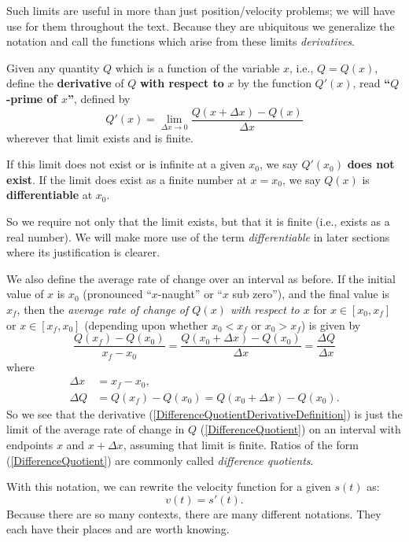 Such limits are useful in more than just position/velocity problems;
we will have use for them throughout the text.
Because they are ubiquitous we generalize the notation
and call the functions which arise from these limits
{\it derivatives}.  
%
\begin{definition}Given any quantity $Q$ which is a 
function of the variable $x$, i.e., $Q=Q(x)$,
define the {\bf derivative} of $Q$ {\bf with respect
to} $x$ by the function $Q'(x)$, read
{\bf ``$Q$-prime of $x$''}, defined by
\begin{equation}
Q'(x)=\lim_{\Delta x\to0}\frac{Q(x+\Delta x)-Q(x)}{\Delta x}
\label{DifferenceQuotientDerivativeDefinition}\end{equation}
wherever that limit exists and is finite.

If this limit does not exist or is infinite at a given $x_0$,
we say $Q'(x_0)$ {\bf does not exist}.  If the limit does
exist as a finite number at $x=x_0$, we say $Q(x)$ is
{\bf differentiable} at $x_0$.
\end{definition}

So we require not only that the limit exists, but
that it is finite (i.e., exists as a real number).
We will make more use of the term {\it differentiable} 
in later sections where its justification is clearer.

We also define the average rate of change over an interval
as before.  If the initial value of $x$ is $x_0$
(pronounced ``$x$-naught'' or ``$x$ sub zero''),
and the final value is $x_f$, then the {\it average rate of change
of $Q(x)$ with respect to $x$} for 
$x\in[x_0,x_f]$ or $x\in[x_f,x_0]$ (depending upon
whether $x_0<x_f$ or $x_0>x_f$) is given by
\begin{equation}
\frac{Q(x_f)-Q(x_0)}{x_f-x_0}
=\frac{Q(x_0+\Delta x)-Q(x_0)}{\Delta x}
=\frac{\Delta Q}{\Delta x}
\label{DifferenceQuotient}\end{equation}
where 
\begin{align}
\Delta x&=x_f-x_0,\\
\Delta Q&=Q(x_f)-Q(x_0)=Q(x_0+\Delta x)-Q(x_0).\end{align}
So we see that the derivative 
(\ref{DifferenceQuotientDerivativeDefinition}) is just the limit
of the average rate of change in $Q$ (\ref{DifferenceQuotient})
on an interval with 
endpoints $x$ and $x+\Delta x$, assuming that limit is finite.
Ratios of the form (\ref{DifferenceQuotient}) are commonly
called {\it difference quotients}.


With this notation, we can rewrite the velocity
function for a given $s(t)$ as:
\begin{equation}
v(t)=s'(t).\end{equation}
Because there are so many contexts, there are
many different notations.  They each have their
places and are worth knowing.\footnotemark\hphantom{. }

